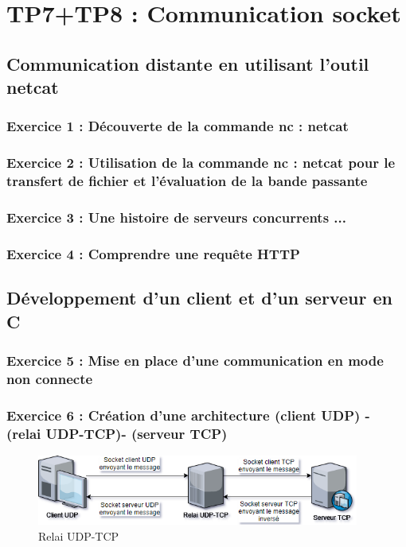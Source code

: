 \chapter{TP7+TP8 : Communication socket}

\section{Communication distante en utilisant l’outil netcat}

\subsection{Exercice 1 : Découverte de la commande nc : netcat}

\subsection{Exercice 2 : Utilisation de la commande nc : netcat pour le transfert de fichier et l’évaluation de
la bande passante}

\subsection{Exercice 3 : Une histoire de serveurs concurrents ...}

\subsection{Exercice 4 : Comprendre une requête HTTP}

\section{Développement d’un client et d’un serveur en C}

\subsection{Exercice 5 : Mise en place d’une communication en mode non connecte}

\subsection{Exercice 6 : Création d’une architecture (client UDP) - (relai UDP-TCP)- (serveur TCP)}

\begin{figure}[H]
\centering
\includegraphics[width=300pt]{./cpp/Pictures/tp7+tp8-relay-UDP-TCP}
\caption{Relai UDP-TCP}
\label{Relai UDP-TCP}
\end{figure}

